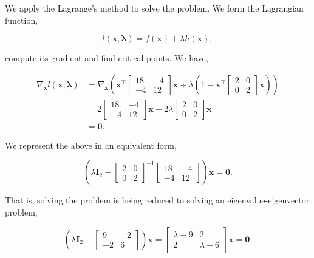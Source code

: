 We apply the Lagrange's method to solve the problem. We form the Lagrangian function,

\[
	l(\boldsymbol{x}, \boldsymbol{\lambda})=f(\boldsymbol{x})+ \lambda h(\boldsymbol{x}),
\]

compute its gradient and find critical points. We have,

\[
	\begin{aligned}
		\nabla_{\boldsymbol{x}} l (\boldsymbol{x}, \boldsymbol{\lambda}) & =\nabla_{\boldsymbol{x}}\left(\boldsymbol{x}^{\top}\left[\begin{array}{cc}
			18 & -4 \\
			-4 & 12
		\end{array}\right] \boldsymbol{x}+\lambda\left(1-\boldsymbol{x}^{\top}\left[\begin{array}{ll}
			2 & 0 \\
			0 & 2
		\end{array}\right] \boldsymbol{x}\right)\right) \\
		& =2\left[\begin{array}{cc}
			18 & -4 \\
			-4 & 12
		\end{array}\right] \boldsymbol{x}-2 \lambda \left[\begin{array}{cc}
			2 & 0 \\
			0 & 2
		\end{array}\right] \boldsymbol{x} \\
		& =\boldsymbol{0} .
	\end{aligned}
\]

We represent the above in an equivalent form,

\[
	\left(\lambda \boldsymbol{I}_{2}-\left[\begin{array}{ll}
		2 & 0 \\
		0 & 2
	\end{array}\right]^{-1}\left[\begin{array}{cc}
		18 & -4 \\
		-4 & 12
	\end{array}\right]\right) \boldsymbol{x}= \boldsymbol{0}.
\]

That is, solving the problem is being reduced to solving an eigenvalue-eigenvector problem,

\[
	\left(\lambda \boldsymbol{I}_{2}-\left[\begin{array}{cc}
		9 & -2 \\
		-2 & 6
	\end{array}\right]\right) \boldsymbol{x}=\left[\begin{array}{cc}
		\lambda-9 & 2 \\
		2 & \lambda-6
	\end{array}\right] \boldsymbol{x}=\boldsymbol{0} .
\]

